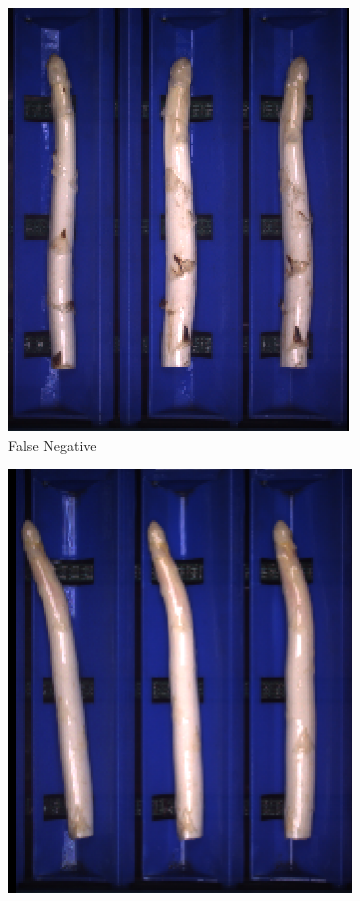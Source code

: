 \begin{figure}[h]
	\centering
	\begin{subfigure}{0.3\textwidth}
		\includegraphics[width=0.9\linewidth]{Figures/appendix/medium_falsenegative_01.png}
		\vspace{-5pt} 
		\caption{False Negative}
	\end{subfigure}
	\begin{subfigure}{0.3\textwidth}
		\includegraphics[width=0.9\linewidth]{Figures/appendix/medium_falsenegative_02.png}

\end{subfigure}
\end{figure}
